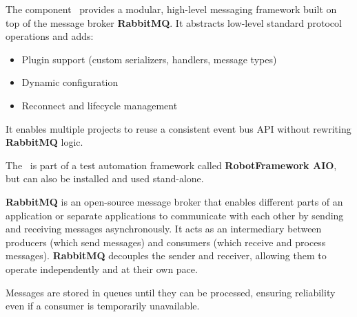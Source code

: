 




The component \pkg\ provides a modular, high-level messaging framework built on top of the message broker \textbf{RabbitMQ}.
It abstracts low-level standard protocol operations and adds:
\begin{itemize}
   \item Plugin support (custom serializers, handlers, message types)
   \item Dynamic configuration
   \item Reconnect and lifecycle management
\end{itemize}

It enables multiple projects to reuse a consistent event bus API without rewriting \textbf{RabbitMQ} logic.

\vspace{2ex}

The \pkg\ is part of a test automation framework called \textbf{RobotFramework AIO}, but can also be installed
and used stand-alone.

\vspace{2ex}

\textbf{RabbitMQ} is an open-source message broker that enables different parts of an application or separate applications to communicate
with each other by sending and receiving messages asynchronously. It acts as an intermediary between producers (which send messages)
and consumers (which receive and process messages). \textbf{RabbitMQ} decouples the sender and receiver, allowing them to operate independently
and at their own pace. 

Messages are stored in queues until they can be processed, ensuring reliability even if a consumer is temporarily unavailable.

